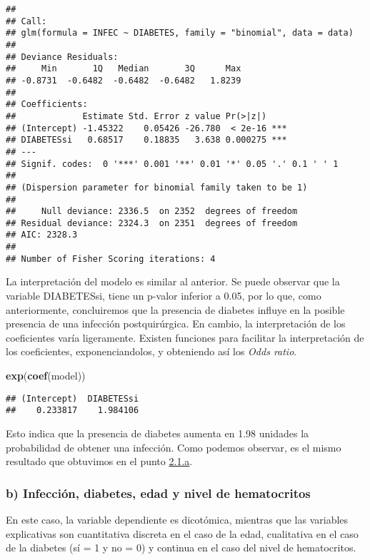 \documentclass[]{article}
\newenvironment{Shaded}{\begin{snugshade}}{\end{snugshade}}
\newcommand{\KeywordTok}[1]{\textcolor[rgb]{0.13,0.29,0.53}{\textbf{#1}}}
\newcommand{\NormalTok}[1]{#1}
\begin{document}
\begin{verbatim}
## 
## Call:
## glm(formula = INFEC ~ DIABETES, family = "binomial", data = data)
## 
## Deviance Residuals: 
##     Min       1Q   Median       3Q      Max  
## -0.8731  -0.6482  -0.6482  -0.6482   1.8239  
## 
## Coefficients:
##             Estimate Std. Error z value Pr(>|z|)    
## (Intercept) -1.45322    0.05426 -26.780  < 2e-16 ***
## DIABETESsi   0.68517    0.18835   3.638 0.000275 ***
## ---
## Signif. codes:  0 '***' 0.001 '**' 0.01 '*' 0.05 '.' 0.1 ' ' 1
## 
## (Dispersion parameter for binomial family taken to be 1)
## 
##     Null deviance: 2336.5  on 2352  degrees of freedom
## Residual deviance: 2324.3  on 2351  degrees of freedom
## AIC: 2328.3
## 
## Number of Fisher Scoring iterations: 4
\end{verbatim}

La interpretación del modelo es similar al anterior. Se puede observar
que la variable DIABETESsi, tiene un p-valor inferior a 0.05, por lo
que, como anteriormente, concluiremos que la presencia de diabetes
influye en la posible presencia de una infección postquirúrgica. En
cambio, la interpretación de los coeficientes varía ligeramente. Existen
funciones para facilitar la interpretación de los coeficientes,
exponenciandolos, y obteniendo así los \emph{Odds ratio}.

\begin{Shaded}
\begin{Highlighting}[]
\KeywordTok{exp}\NormalTok{(}\KeywordTok{coef}\NormalTok{(model))}
\end{Highlighting}
\end{Shaded}

\begin{verbatim}
## (Intercept)  DIABETESsi 
##    0.233817    1.984106
\end{verbatim}

Esto indica que la presencia de diabetes aumenta en 1.98 unidades la
probabilidad de obtener una infección. Como podemos observar, es el
mismo resultado que obtuvimos en el punto
\protect\hyperlink{21a}{2.1.a}.

\hypertarget{b-infecciuxf3n-diabetes-edad-y-nivel-de-hematocritos}{%
\subsubsection{b) Infección, diabetes, edad y nivel de
hematocritos}\label{b-infecciuxf3n-diabetes-edad-y-nivel-de-hematocritos}}

En este caso, la variable dependiente es dicotómica, mientras que las
variables explicativas son cuantitativa discreta en el caso de la edad,
cualitativa en el caso de la diabetes (sí = 1 y no = 0) y continua en el
caso del nivel de hematocritos.
\end{document}
